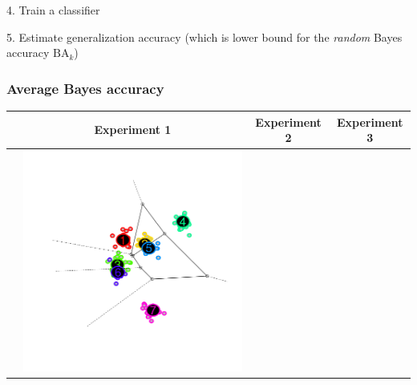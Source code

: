 \documentclass{beamer}
\begin{document}
\begin{frame}
\vspace{0.2in}
4. Train a classifier

\vspace{0.2in}
5. Estimate generalization accuracy (which is lower bound for the \emph{random} Bayes accuracy $\text{BA}_k$)
\end{frame}

\begin{frame}
\frametitle{Average Bayes accuracy}
\begin{center}
\begin{tabular}{c|c|c|c}
& Experiment 1 & Experiment 2 & Experiment 3\\\hline
&\includegraphics[scale = 0.15, clip = true, trim = 0.6in 0.2in 0.6in 0.2in]{../info_theory_paper/gaussian_figure1a.png} &

\end{tabular}
\end{center}
\end{frame}
\end{document}
